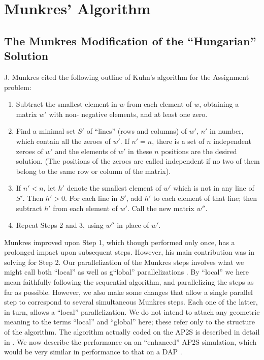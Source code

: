 \section{Munkres' Algorithm}
\label{munkres}

\subsection{The Munkres Modification of the ``Hungarian'' Solution}
\label{munkres_modify}

J. Munkres cited the following outline of Kuhn's algorithm for 
the Assignment problem:

\begin{enumerate}
\item 
Subtract the smallest element in $w$ from each element of $w$, 
obtaining a matrix $w'$ with non- negative elements, and at least one zero.

\item Find a minimal set $S'$ of ``lines'' (rows and columns) of $w'$, 
$n'$ in number, which contain all the zeroes of $w'$.  If $n' = n$, there 
is a set of $n$ independent zeroes of $w'$ and the elements of $w'$ 
in these $n$ positions are the desired solution.  (The positions of 
the zeroes are called independent if no two of them belong 
to the same row or column of the matrix).

\item If $n' < n$, let $h'$ denote the smallest element of $w'$ which 
is not in any line of $S'$.  Then $h' > 0$.  
For each line in $S'$, add $h'$ to each element of that line; then 
subtract $h'$ from each element of 
$w'$.  Call the new matrix $w''$.

\item Repeat Steps 2 and 3, using $w''$ in place of $w'$.

\end{enumerate}

Munkres improved upon Step 1, which though performed only once, 
has a prolonged impact upon subsequent steps.  However, 
his main contribution was in solving for Step 2.  Our 
parallelization of the Munkres steps involves what we might 
call both ``local'' as well as g``lobal'' parallelizations \cite{ho87,ra87}. 
By ``local'' we here mean faithfully following the sequential 
algorithm, and parallelizing the steps as far as possible.  However,
we also make some changes that allow a single parallel step to 
correspond to several simultaneous Munkres steps.  Each one of the 
latter, in turn, allows a ``local'' parallelization.  We do not 
intend to attach any geometric meaning to the terms ``local'' and ``global''
here; these refer only to the structure of the algorithm.  
The algorithm actually coded on the AP2S is described in 
detail in \cite{ho87}.  We now describe the performance on 
an ``enhanced'' AP2S simulation, which would be very similar 
in performance to that on a DAP \cite{re78}.

